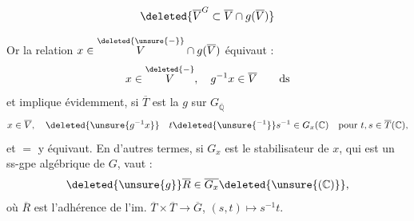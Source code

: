 \[
\deleted{\overline V^{G}\subset\overline V\cap g(\overline V)}
\]

Or la relation $x\in\overset{\deleted{\unsure{-}}}{V}\cap g(\overline V)$ équivaut :
\begingroup\makeatletter\tagsleft@true\makeatother
\[
x\in\overset{\deleted{-}}{V},\quad g^{-1}x\in\overline V \tag*{ds}
\]
\endgroup
et implique évidemment, si $\overline T$ est la   $g$ sur $G_{\overline{\mathbb Q}}$
\[
x\in\overline V,\quad\deleted{\unsure{g^{-1}x}}\quad t\deleted{\unsure{^{-1}}}s^{-1}\in G_x(\mathbb C)\quad\text{pour }t,s\in\overline T(\mathbb C),
\]
et $=$ y équivaut.
En d'autres termes, si $G_x$ est le stabilisateur de $x$, qui est un ss-gpe algébrique de $G$,  vaut :
\[
\deleted{\unsure{g}}\overline R\in\overline{G_x}\deleted{\unsure{(\mathbb C)}},
\]
où $\overline R$ est l'adhérence de l'im. $\overline T\times\overline T\longrightarrow\overline G$, $(s,t)\longmapsto s^{-1}t$.

